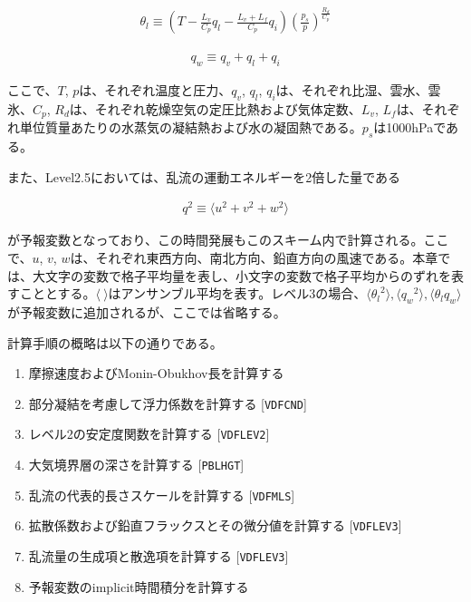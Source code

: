 \begin{eqnarray} \theta_l \equiv \left(T - \frac{L_v}{C_p}q_l - \frac{L_v+L_f}{C_p}q_i \right) \left(\frac{p_s}{p}\right)^{\frac{R_d}{C_p}} \end{eqnarray}

\begin{eqnarray} q_w \equiv q_v+q_l+q_i \end{eqnarray}

ここで、\(T\), \(p\)は、それぞれ温度と圧力、\(q_v\), \(q_l\),
\(q_i\)は、それぞれ比湿、雲水、雲氷、\(C_p\),
\(R_d\)は、それぞれ乾燥空気の定圧比熱および気体定数、\(L_v\),
\(L_f\)は、それぞれ単位質量あたりの水蒸気の凝結熱および水の凝固熱である。\(p_s\)は1000hPaである。

また、Level2.5においては、乱流の運動エネルギーを2倍した量である

\begin{eqnarray}q^2 \equiv \langle u^2 + v^2 + w^2 \rangle\end{eqnarray}

が予報変数となっており、この時間発展もこのスキーム内で計算される。ここで、\(u\),
\(v\),
\(w\)は、それぞれ東西方向、南北方向、鉛直方向の風速である。本章では、大文字の変数で格子平均量を表し、小文字の変数で格子平均からのずれを表すこととする。\(\langle \ \rangle\)はアンサンブル平均を表す。レベル3の場合、\(\langle {\theta_l}^2 \rangle,\langle {q_w}^2 \rangle,\langle \theta_l q_w \rangle\)
が予報変数に追加されるが、ここでは省略する。

計算手順の概略は以下の通りである。

\begin{enumerate}
\def\labelenumi{\arabic{enumi}.}
\tightlist
\item
  摩擦速度およびMonin-Obukhov長を計算する
\item
  部分凝結を考慮して浮力係数を計算する {[}\texttt{VDFCND}{]}
\item
  レベル2の安定度関数を計算する {[}\texttt{VDFLEV2}{]}
\item
  大気境界層の深さを計算する {[}\texttt{PBLHGT}{]}
\item
  乱流の代表的長さスケールを計算する {[}\texttt{VDFMLS}{]}
\item
  拡散係数および鉛直フラックスとその微分値を計算する
  {[}\texttt{VDFLEV3}{]}
\item
  乱流量の生成項と散逸項を計算する {[}\texttt{VDFLEV3}{]}
\item
  予報変数のimplicit時間積分を計算する
\end{enumerate}

